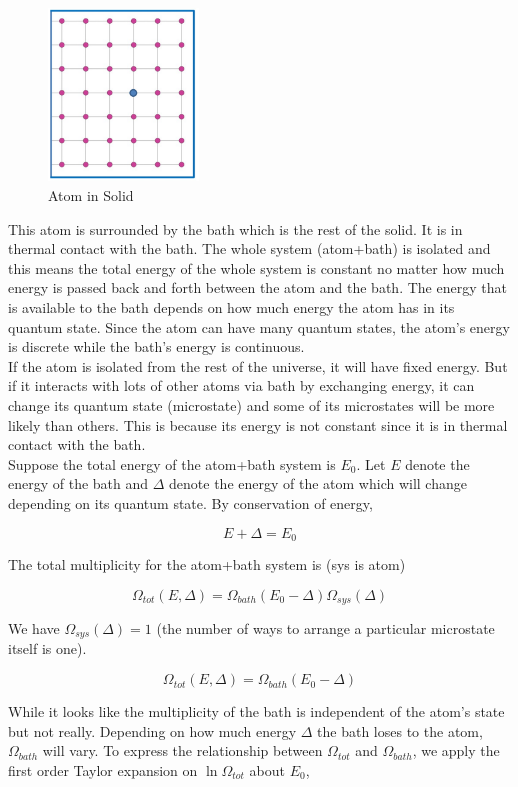 \documentclass[12pt, a4paper]{article}
\begin{document}
\begin{figure}[H]
\centering
\includegraphics[width=40mm]{12.png}
\caption{Atom in Solid}
\end{figure}

This atom is surrounded by the bath which is the rest of the solid. It is in thermal contact with the bath. The whole system (atom+bath) is isolated and this means the total energy of the whole system is constant no matter how much energy is passed back and forth between the atom and the bath. The energy that is available to the bath depends on how much energy the atom has in its quantum state. Since the atom can have many quantum states, the atom's energy is discrete while the bath's energy is continuous. \\

If the atom is isolated from the rest of the universe, it will have fixed energy. But if it interacts with lots of other atoms via bath by exchanging energy, it can change its quantum state (microstate) and some of its microstates will be more likely than others. This is because its energy is not constant since it is in thermal contact with the bath. \\

Suppose the total energy of the atom+bath system is $E_0$. Let $E$ denote the energy of the bath and $\Delta$ denote the energy of the atom which will change depending on its quantum state. By conservation of energy,

$$E+\Delta=E_0$$

The total multiplicity for the atom+bath system is (sys is atom)

$$\Omega_{tot}(E,\Delta)=\Omega_{bath}(E_0-\Delta)\Omega_{sys}(\Delta)$$

We have $\Omega_{sys}(\Delta)=1$ (the number of ways to arrange a particular microstate itself is one).

$$\Omega_{tot}(E,\Delta)=\Omega_{bath}(E_0-\Delta)$$

While it looks like the multiplicity of the bath is independent of the atom's state but not really. Depending on how much energy $\Delta$ the bath loses to the atom, $\Omega_{bath}$ will vary. To express the relationship between $\Omega_{tot}$ and $\Omega_{bath}$, we apply the first order Taylor expansion on $\ln\Omega_{tot}$ about $E_0$,
\end{document}
